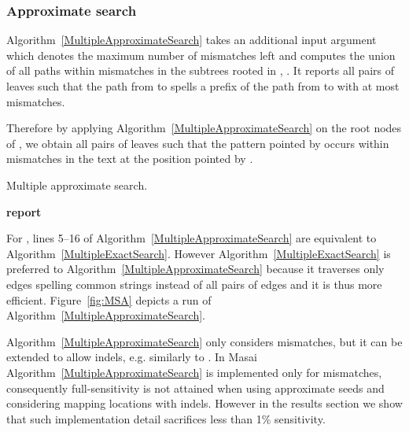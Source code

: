 \documentclass[a4,center,fleqn]{article}
\newcommand{\Report}{\textbf{report }}
\newcommand{\eg}{{e.g.}\xspace}
\begin{document}
\subsubsection{Approximate search}

Algorithm~\ref{MultipleApproximateSearch} takes an additional input argument  which denotes the maximum number of mismatches left and computes the union of all paths within  mismatches in the subtrees rooted in , . It reports all pairs of leaves  such that the path from  to  spells a prefix of the path from  to  with at most  mismatches.

Therefore by applying Algorithm~\ref{MultipleApproximateSearch} on the root nodes of ,  we obtain all pairs of leaves  such that the pattern pointed by  occurs within  mismatches in the text at the position pointed by .

\vspace*{2mm}
\begin{algorithm}
\caption{Multiple approximate search.}
\label{MultipleApproximateSearch}
\begin{algorithmic}[1]
	\If {}
		\State {}
	\Else
			\State \Report 
		\Else
			\ForAll {}
				\ForAll {}
					\If {}
						\State {}
					\Else
						\State {}
					\EndIf
				\EndFor
			\EndFor
		\EndIf
	\EndIf
\EndProcedure
\end{algorithmic}
\end{algorithm}

For , lines 5--16 of Algorithm~\ref{MultipleApproximateSearch} are equivalent to Algorithm~\ref{MultipleExactSearch}.
However Algorithm~\ref{MultipleExactSearch} is preferred to Algorithm~\ref{MultipleApproximateSearch} because it traverses only edges spelling common strings instead of all pairs of edges and it is thus more efficient.
Figure~\ref{fig:MSA} depicts a run of Algorithm~\ref{MultipleApproximateSearch}.

Algorithm~\ref{MultipleApproximateSearch} only considers mismatches, but it can be extended to allow indels, \eg similarly to \cite{Navarro2000}.
In Masai Algorithm~\ref{MultipleApproximateSearch} is implemented only for mismatches, consequently full-sensitivity is not attained when using approximate seeds and considering mapping locations with indels.
However in the results section we show that such implementation detail sacrifices less than 1\% sensitivity.
\end{document}
